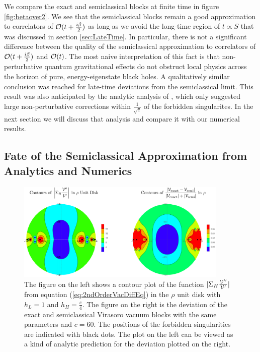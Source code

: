 We compare the exact and semiclassical blocks at finite time in figure \ref{fig:betaover2}.   We see that the semiclassical blocks remain a good approximation to correlators of ${\cal O}(t + \frac{i \beta}{2})$ as long as we avoid the long-time region of $t \propto S$ that was discussed in section \ref{sec:LateTime}.  In particular,  there is not a significant difference between the quality of the semiclassical approximation to correlators of ${\cal O}(t + \frac{i \beta}{2})$ and ${\cal O}(t)$.  The most naive interpretation of this fact is that non-perturbative quantum gravitational effects do not obstruct local physics across the horizon of pure, energy-eigenstate black holes.  A qualitatively similar conclusion was reached for late-time deviations \cite{Kabat:2014kfa} from the semiclassical limit.  This result was also anticipated by the analytic analysis of \cite{Fitzpatrick:2016ive}, which only suggested large non-perturbative corrections within $\frac{1}{\sqrt{c}}$ of the forbidden singularites.  In the next section we will discuss that analysis and compare it with our numerical results.


\subsection{Fate of the Semiclassical Approximation from Analytics and Numerics}
\label{sec:FateSemiclassical}

\begin{figure}[t]
\centering{}\includegraphics[width=0.9\textwidth]{virasoro_chapter/ContoursSigmaFunction}
\caption{The figure on the left shows a contour plot of the function $|\Sigma_{H} \frac{{\cal V}''}{{\cal V}'}|$ from equation (\ref{eq:2ndOrderVacDiffEq}) in the $\rho$ unit disk with $h_L = 1$ and $h_H = \frac{c}{4}$.  The figure on the right is the deviation of the exact and semiclassical Virasoro vacuum blocks with the same parameters and $c = 60$.  The positions of the forbidden singularities are indicated with black dots. The plot on the left can be viewed as a kind of analytic prediction for the deviation plotted on the right. }
\label{fig:ContoursSigmaFunction}
\end{figure}

